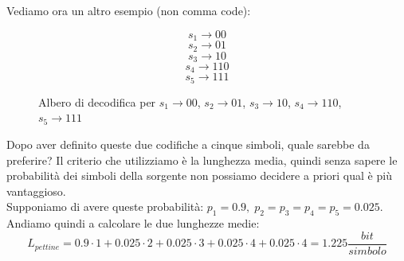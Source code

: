 Vediamo ora un altro esempio (non comma code):

\begin{equation*}
s_1 \rightarrow 00
\end{equation*}
\begin{equation*}
s_2 \rightarrow 01
\end{equation*}
\begin{equation*}
s_3 \rightarrow 10
\end{equation*}
\begin{equation*}
s_4 \rightarrow 110
\end{equation*}
\begin{equation*}
s_5 \rightarrow 111
\end{equation*}

\begin{figure}[H]
	\centering
	\caption{Albero di decodifica per $s_1 \rightarrow 00$, $s_2 \rightarrow 01$, $s_3 \rightarrow 10$, $s_4 \rightarrow 110$, $s_5 \rightarrow 111$}
\end{figure}

Dopo aver definito queste due codifiche a cinque simboli, quale sarebbe da preferire?
Il criterio che utilizziamo è la lunghezza media, quindi senza sapere le probabilità dei simboli della sorgente non possiamo decidere a priori qual è più vantaggioso.\\
Supponiamo di avere queste probabilità: $p_1 = 0.9, \; p_2 = p_3 = p_4 = p_5 =  0.025$.
Andiamo quindi a calcolare le due lunghezze medie:
\begin{equation*}
L_{pettine} = 0.9 \cdot 1 + 0.025 \cdot 2 + 0.025 \cdot 3 + 0.025 \cdot 4 + 0.025 \cdot 4 = 1.225\frac{bit}{simbolo}
\end{equation*}

